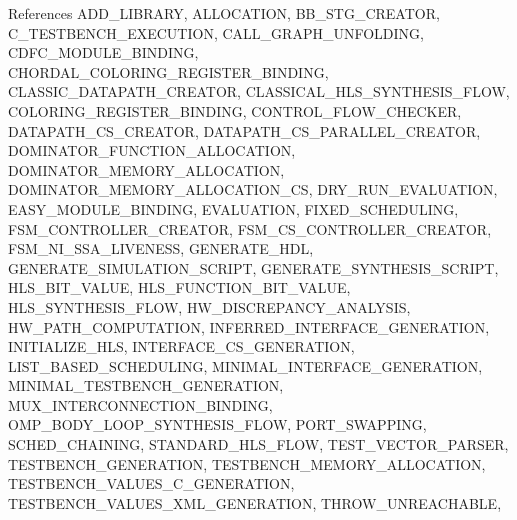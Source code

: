 References A\+D\+D\+\_\+\+L\+I\+B\+R\+A\+RY, A\+L\+L\+O\+C\+A\+T\+I\+ON, B\+B\+\_\+\+S\+T\+G\+\_\+\+C\+R\+E\+A\+T\+OR, C\+\_\+\+T\+E\+S\+T\+B\+E\+N\+C\+H\+\_\+\+E\+X\+E\+C\+U\+T\+I\+ON, C\+A\+L\+L\+\_\+\+G\+R\+A\+P\+H\+\_\+\+U\+N\+F\+O\+L\+D\+I\+NG, C\+D\+F\+C\+\_\+\+M\+O\+D\+U\+L\+E\+\_\+\+B\+I\+N\+D\+I\+NG, C\+H\+O\+R\+D\+A\+L\+\_\+\+C\+O\+L\+O\+R\+I\+N\+G\+\_\+\+R\+E\+G\+I\+S\+T\+E\+R\+\_\+\+B\+I\+N\+D\+I\+NG, C\+L\+A\+S\+S\+I\+C\+\_\+\+D\+A\+T\+A\+P\+A\+T\+H\+\_\+\+C\+R\+E\+A\+T\+OR, C\+L\+A\+S\+S\+I\+C\+A\+L\+\_\+\+H\+L\+S\+\_\+\+S\+Y\+N\+T\+H\+E\+S\+I\+S\+\_\+\+F\+L\+OW, C\+O\+L\+O\+R\+I\+N\+G\+\_\+\+R\+E\+G\+I\+S\+T\+E\+R\+\_\+\+B\+I\+N\+D\+I\+NG, C\+O\+N\+T\+R\+O\+L\+\_\+\+F\+L\+O\+W\+\_\+\+C\+H\+E\+C\+K\+ER, D\+A\+T\+A\+P\+A\+T\+H\+\_\+\+C\+S\+\_\+\+C\+R\+E\+A\+T\+OR, D\+A\+T\+A\+P\+A\+T\+H\+\_\+\+C\+S\+\_\+\+P\+A\+R\+A\+L\+L\+E\+L\+\_\+\+C\+R\+E\+A\+T\+OR, D\+O\+M\+I\+N\+A\+T\+O\+R\+\_\+\+F\+U\+N\+C\+T\+I\+O\+N\+\_\+\+A\+L\+L\+O\+C\+A\+T\+I\+ON, D\+O\+M\+I\+N\+A\+T\+O\+R\+\_\+\+M\+E\+M\+O\+R\+Y\+\_\+\+A\+L\+L\+O\+C\+A\+T\+I\+ON, D\+O\+M\+I\+N\+A\+T\+O\+R\+\_\+\+M\+E\+M\+O\+R\+Y\+\_\+\+A\+L\+L\+O\+C\+A\+T\+I\+O\+N\+\_\+\+CS, D\+R\+Y\+\_\+\+R\+U\+N\+\_\+\+E\+V\+A\+L\+U\+A\+T\+I\+ON, E\+A\+S\+Y\+\_\+\+M\+O\+D\+U\+L\+E\+\_\+\+B\+I\+N\+D\+I\+NG, E\+V\+A\+L\+U\+A\+T\+I\+ON, F\+I\+X\+E\+D\+\_\+\+S\+C\+H\+E\+D\+U\+L\+I\+NG, F\+S\+M\+\_\+\+C\+O\+N\+T\+R\+O\+L\+L\+E\+R\+\_\+\+C\+R\+E\+A\+T\+OR, F\+S\+M\+\_\+\+C\+S\+\_\+\+C\+O\+N\+T\+R\+O\+L\+L\+E\+R\+\_\+\+C\+R\+E\+A\+T\+OR, F\+S\+M\+\_\+\+N\+I\+\_\+\+S\+S\+A\+\_\+\+L\+I\+V\+E\+N\+E\+SS, G\+E\+N\+E\+R\+A\+T\+E\+\_\+\+H\+DL, G\+E\+N\+E\+R\+A\+T\+E\+\_\+\+S\+I\+M\+U\+L\+A\+T\+I\+O\+N\+\_\+\+S\+C\+R\+I\+PT, G\+E\+N\+E\+R\+A\+T\+E\+\_\+\+S\+Y\+N\+T\+H\+E\+S\+I\+S\+\_\+\+S\+C\+R\+I\+PT, H\+L\+S\+\_\+\+B\+I\+T\+\_\+\+V\+A\+L\+UE, H\+L\+S\+\_\+\+F\+U\+N\+C\+T\+I\+O\+N\+\_\+\+B\+I\+T\+\_\+\+V\+A\+L\+UE, H\+L\+S\+\_\+\+S\+Y\+N\+T\+H\+E\+S\+I\+S\+\_\+\+F\+L\+OW, H\+W\+\_\+\+D\+I\+S\+C\+R\+E\+P\+A\+N\+C\+Y\+\_\+\+A\+N\+A\+L\+Y\+S\+IS, H\+W\+\_\+\+P\+A\+T\+H\+\_\+\+C\+O\+M\+P\+U\+T\+A\+T\+I\+ON, I\+N\+F\+E\+R\+R\+E\+D\+\_\+\+I\+N\+T\+E\+R\+F\+A\+C\+E\+\_\+\+G\+E\+N\+E\+R\+A\+T\+I\+ON, I\+N\+I\+T\+I\+A\+L\+I\+Z\+E\+\_\+\+H\+LS, I\+N\+T\+E\+R\+F\+A\+C\+E\+\_\+\+C\+S\+\_\+\+G\+E\+N\+E\+R\+A\+T\+I\+ON, L\+I\+S\+T\+\_\+\+B\+A\+S\+E\+D\+\_\+\+S\+C\+H\+E\+D\+U\+L\+I\+NG, M\+I\+N\+I\+M\+A\+L\+\_\+\+I\+N\+T\+E\+R\+F\+A\+C\+E\+\_\+\+G\+E\+N\+E\+R\+A\+T\+I\+ON, M\+I\+N\+I\+M\+A\+L\+\_\+\+T\+E\+S\+T\+B\+E\+N\+C\+H\+\_\+\+G\+E\+N\+E\+R\+A\+T\+I\+ON, M\+U\+X\+\_\+\+I\+N\+T\+E\+R\+C\+O\+N\+N\+E\+C\+T\+I\+O\+N\+\_\+\+B\+I\+N\+D\+I\+NG, O\+M\+P\+\_\+\+B\+O\+D\+Y\+\_\+\+L\+O\+O\+P\+\_\+\+S\+Y\+N\+T\+H\+E\+S\+I\+S\+\_\+\+F\+L\+OW, P\+O\+R\+T\+\_\+\+S\+W\+A\+P\+P\+I\+NG, S\+C\+H\+E\+D\+\_\+\+C\+H\+A\+I\+N\+I\+NG, S\+T\+A\+N\+D\+A\+R\+D\+\_\+\+H\+L\+S\+\_\+\+F\+L\+OW, T\+E\+S\+T\+\_\+\+V\+E\+C\+T\+O\+R\+\_\+\+P\+A\+R\+S\+ER, T\+E\+S\+T\+B\+E\+N\+C\+H\+\_\+\+G\+E\+N\+E\+R\+A\+T\+I\+ON, T\+E\+S\+T\+B\+E\+N\+C\+H\+\_\+\+M\+E\+M\+O\+R\+Y\+\_\+\+A\+L\+L\+O\+C\+A\+T\+I\+ON, T\+E\+S\+T\+B\+E\+N\+C\+H\+\_\+\+V\+A\+L\+U\+E\+S\+\_\+\+C\+\_\+\+G\+E\+N\+E\+R\+A\+T\+I\+ON, T\+E\+S\+T\+B\+E\+N\+C\+H\+\_\+\+V\+A\+L\+U\+E\+S\+\_\+\+X\+M\+L\+\_\+\+G\+E\+N\+E\+R\+A\+T\+I\+ON, T\+H\+R\+O\+W\+\_\+\+U\+N\+R\+E\+A\+C\+H\+A\+B\+LE, 